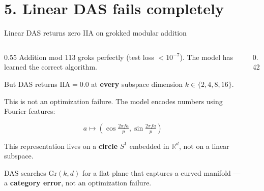 \documentclass[aspectratio=169,11pt]{beamer}
\newcommand{\Gr}{\mathrm{Gr}}
\newcommand{\IIA}{\mathrm{IIA}}
\newcommand{\R}{\mathbb{R}}
\begin{document}
\section{5. Linear DAS fails completely}

\begin{frame}{Linear DAS returns zero IIA on grokked modular addition}

\begin{columns}[T]
\begin{column}{0.55\textwidth}
{\small Addition mod 113 groks perfectly (test loss $< 10^{-7}$). The model has learned the correct algorithm.}

\vspace{0.3em}
{\small But DAS returns $\IIA = 0.0$ at \textbf{every} subspace dimension $k \in \{2, 4, 8, 16\}$.}

\vspace{0.3em}
{\small This is not an optimization failure. The model encodes numbers using Fourier features:}

$$a \mapsto (\cos \tfrac{2\pi f a}{p}, \sin \tfrac{2\pi f a}{p})$$

{\small This representation lives on a \textbf{circle} $S^1$ embedded in $\R^d$, not on a linear subspace.}

\vspace{0.3em}
{\small DAS searches $\Gr(k,d)$ for a flat plane that captures a curved manifold --- a \textbf{category error}, not an optimization failure.}
\end{column}
\begin{column}{0.42\textwidth}
\end{column}
\end{columns}
\end{frame}
\end{document}
